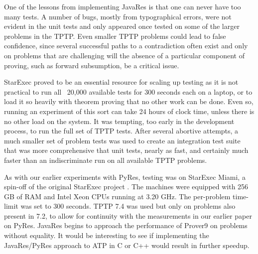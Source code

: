 \documentclass{llncs}
\begin{document}
One of the lessons from implementing JavaRes is that one can never have too many tests.  A number
of bugs, mostly from typographical errors, were not evident in the unit tests and only appeared
once tested on some of the larger problems in the TPTP.  Even smaller TPTP problems could lead to
false confidence, since several successful paths to a contradiction often exist and only on
problems that are challenging will the absence of a particular component of proving, such as
forward subsumption, be a critical issue.

StarExec proved to be an essential resource for scaling up testing as it is not practical to run
all ~20,000 available tests for 300 seconds each on a laptop, or to load it so heavily with
theorem proving that no other work can be done.  Even so, running an experiment of this sort can
take 24 hours of clock time, unless there is no other load on the system. It was tempting, too
early in the development process, to run the full set of TPTP tests.  After several abortive
attempts, a much smaller set of problem tests was used to create an integration test suite that
was more comprehensive that unit tests, nearly as fast, and certainly much faster than an indiscriminate
run on all available TPTP problems.

As with our earlier experiments with PyRes, testing was on StarExec Miami, a spin-off of the
original StarExec project \cite{SST:IJCAR-2014}.
The machines were equipped with 256 GB of RAM and Intel Xeon CPUs running at 3.20 GHz.
The per-problem time-limit was set to 300 seconds. TPTP 7.4 was used but only on problems
also present in 7.2, to allow for continuity with the measurements in our earlier paper
on PyRes.  JavaRes begins to approach the performance of Prover9 on problems without
equality.  It would be interesting to see if implementing the JavaRes/PyRes approach to ATP
in C or C++ would result in further speedup.
\end{document}

